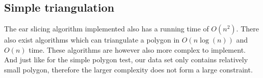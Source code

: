 \subsection{Simple triangulation}
\label{subsec:SimpleTriangulation}
The ear slicing algorithm implemented also has a running time of $O(n^2)$. There also exist algorithms which can triangulate a polygon in $O(n\log(n))$ and $O(n)$ time. These algorithms are however also more complex to implement. And just like for the simple polygon test, our data set only contains relatively small polygon, therefore the larger complexity does not form a large constraint.
